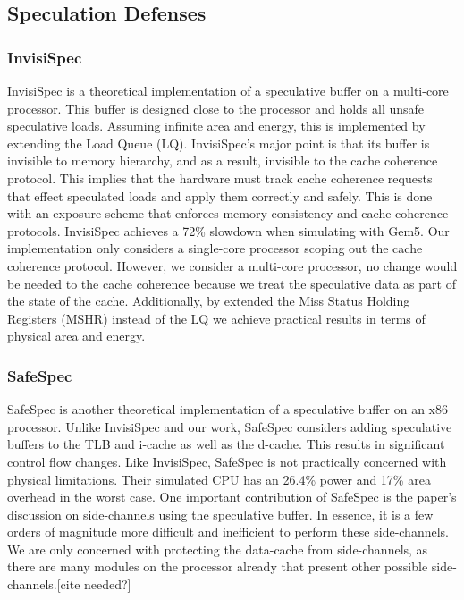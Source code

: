 \subsection{Speculation Defenses}
\subsubsection{InvisiSpec \cite{b46}}

InvisiSpec is a theoretical implementation of a speculative buffer on a multi-core
processor. This buffer is designed close to the processor and holds all unsafe speculative loads.
Assuming infinite area and energy, this is implemented by extending the Load Queue (LQ).
InvisiSpec's major point is that its buffer is invisible to memory hierarchy, and as a result,
invisible to the cache coherence protocol. This implies that the hardware must track cache
coherence requests that effect speculated loads and apply them correctly and safely. This is
done with an exposure scheme that enforces memory consistency and cache coherence protocols.
InvisiSpec achieves a 72\% slowdown when simulating with Gem5. Our implementation only
considers a single-core processor scoping out the cache coherence protocol. However, we consider
a multi-core processor, no change would be needed to the cache coherence because we treat the
speculative data as part of the state of the cache. Additionally, by extended the Miss
Status Holding Registers (MSHR) instead of the LQ we achieve practical results in terms
of physical area and energy.

\subsubsection{SafeSpec \cite{b29}}

SafeSpec is another theoretical implementation of a speculative buffer on an x86 processor.
Unlike InvisiSpec and our work, SafeSpec considers adding speculative buffers to the TLB and 
i-cache as well as the d-cache. This results in significant control flow changes.
Like InvisiSpec, SafeSpec is not practically concerned with physical limitations.
Their simulated CPU has an 26.4\% power and 17\% area overhead in the worst case. One
important contribution of SafeSpec is the paper's discussion on side-channels using the speculative
buffer. In essence, it is a few orders of magnitude more difficult and inefficient to perform
these side-channels. We are only concerned with protecting the data-cache from side-channels, as
there are many modules on the processor already that present other possible side-channels.[cite needed?]

